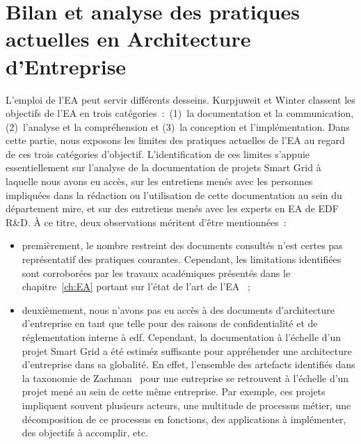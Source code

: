 \section{Bilan et analyse des pratiques actuelles en Architecture d'Entreprise}


L'emploi de l'EA peut servir différents desseins. Kurpjuweit et Winter
\cite{kurpjuweit2007viewpoint} classent les objectifs de l'EA en trois
catégories~:~(1)~la documentation et la communication, (2)~l'analyse
et la compréhension et (3)~la conception et l'implémentation. Dans
cette partie, nous exposons les limites des pratiques actuelles de
l'EA au regard de ces trois catégories d'objectif. L'identification de
ces limites s'appuie essentiellement sur l'analyse de la documentation
de projets Smart Grid à laquelle nous avons eu accès, sur les
entretiens menés avec les personnes impliquées dans la rédaction ou
l'utilisation de cette documentation au sein du département
\gls{mire}, et sur des entretiens menés avec les experts en EA de
EDF R\&D. À ce titre, deux observations méritent d'être mentionnées~:

\begin{itemize}

 \item  premièrement, le nombre restreint des documents consultés
 n'est certes pas représentatif des pratiques courantes. Cependant,
 les limitations identifiées sont corroborées par les travaux
 académiques présentés dans le chapitre~\ref{ch:EA} portant sur
 l'état de l'art de l'EA ~;

 \item deuxièmement, nous n'avons pas eu accès à des documents
 d'architecture d'entreprise en tant que telle pour des raisons de
 confidentialité et de réglementation interne  à \gls{edf}. Cependant,
 la documentation à l'échelle d'un projet Smart Grid a été estiméz
 suffisante pour appréhender une architecture d'entreprise dans sa
 globalité. En effet, l'ensemble des artefacts identifiés dans la taxonomie de
 Zachman~\cite{zachman1987framework} pour une entreprise se
 retrouvent à l'échelle d'un projet
 mené au sein de cette même entreprise. Par exemple, ces projets
 impliquent souvent plusieurs acteurs, une multitude de processus
 métier, une décomposition de ce processus en fonctions, des
 applications à implémenter, des objectifs à accomplir, etc.

\end{itemize}



